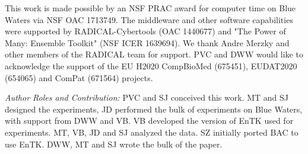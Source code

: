 \footnotesize

This work is made possible by an NSF PRAC award for computer time on Blue Waters via
NSF OAC	1713749. The middleware and other software capabilities were supported by RADICAL-Cybertools (OAC 1440677) and "The Power of Many: Ensemble Toolkit" (NSF ICER 1639694). We thank Andre Merzky and other members of the RADICAL team for support. PVC and DWW would like to acknowledge the support of the EU H2020 CompBioMed (675451), EUDAT2020 (654065) and ComPat (671564) projects.

{\it Author Roles and Contribution:} PVC and SJ conceived this work. MT and SJ
designed the experiments, JD performed the bulk of experiments on Blue Waters,
with support from DWW and VB. VB developed the version of EnTK used for
experiments. MT, VB, JD and SJ analyzed the data. SZ initially ported BAC to
use EnTK. DWW, MT and SJ wrote the bulk of the paper.







